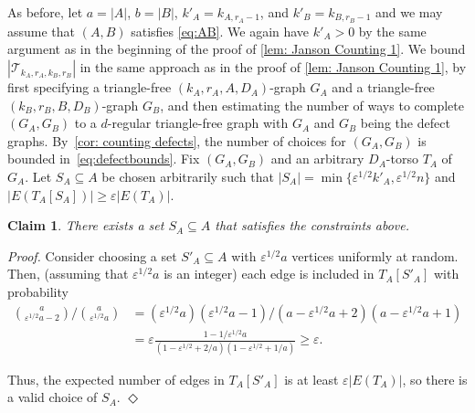 \documentclass[11pt]{article}
\newcommand{\eps}{\varepsilon}
\newenvironment{proofclaim}[1][]%
{\noindent \emph{Proof.} {}{#1}{}}{\hfill
	$\Diamond$\vspace{1em}}
\theoremstyle{plain}
\newtheorem{claim}{Claim}[thm]
\begin{document}
As before,     let $a = |A|$, $b = |B|$, $k'_A = k_{A, r_A - 1}$, and $k'_B = k_{B, r_B - 1}$ and we may assume that $(A,B)$ satisfies \eqref{eq:AB}. We again have $k'_A > 0$ by the same argument as in the beginning of the proof of \cref{lem: Janson Counting 1}.
We bound $|\mathcal T_{k_A, r_A, k_B, r_B}|$ in the same approach as in the proof of \cref{lem: Janson Counting 1}, by first specifying a triangle-free $(k_A, r_A, A, D_{A})$-graph $G_A$ and a triangle-free $(k_B, r_B, B, D_{B})$-graph $G_B$, and then estimating the number of ways to complete $(G_A,G_B)$ to a $d$-regular triangle-free graph with $G_A$ and $G_B$ being the defect graphs.
By~\cref{cor: counting defects},
 the number of choices for $(G_A,G_B)$ is bounded in~\eqref{eq:defectbounds}.
Fix $(G_A,G_B)$ and an arbitrary $D_A$-torso $T_A$ of $G_A$. Let $S_A \subseteq A$ be chosen arbitrarily such that $|S_A| = \min\{\eps^{1/2}k'_A, \eps^{1/2}n\}$ and $|E(T_A[S_A])| \geq \eps|E(T_A)|$. 
    \begin{claim}\label{clm: dense set}
        There exists a set $S_A \subseteq A$ that satisfies the constraints above.
    \end{claim}
    \begin{proofclaim}
    Consider choosing a set $S'_A \subseteq A$ with $\eps^{1/2} a$ vertices uniformly at random. Then, (assuming that $\eps^{1/2} a$ is an integer) each edge is included in $T_A[S'_A]$ with probability
    \begin{align*}
        \binom{a}{\eps^{1/2} a - 2}/\binom{a}{\eps^{1/2} a} &= (\eps^{1/2} a)(\eps^{1/2} a-1)/(a - \eps^{1/2} a + 2)(a - \eps^{1/2} a + 1) \\
        &= \eps \frac{1 - 1/\eps^{1/2} a}{(1 - \eps^{1/2} + 2/a)(1 - \eps^{1/2} + 1/a) } \geq \eps .
    \end{align*}
    
    
    Thus, the expected number of edges in $T_A[S'_A]$ is at least $\eps|E(T_A)|$, so there is a valid choice of $S_A$.
    \end{proofclaim}
\end{document}
